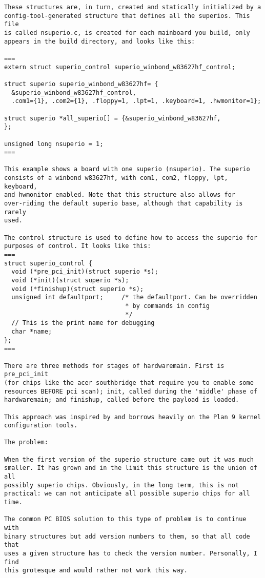 \begin{verbatim}
These structures are, in turn, created and statically initialized by a
config-tool-generated structure that defines all the superios. This file
is called nsuperio.c, is created for each mainboard you build, only 
appears in the build directory, and looks like this:

===
extern struct superio_control superio_winbond_w83627hf_control; 

struct superio superio_winbond_w83627hf= { 
  &superio_winbond_w83627hf_control, 
  .com1={1}, .com2={1}, .floppy=1, .lpt=1, .keyboard=1, .hwmonitor=1};

struct superio *all_superio[] = {&superio_winbond_w83627hf,
};

unsigned long nsuperio = 1;
===

This example shows a board with one superio (nsuperio). The superio
consists of a winbond w83627hf, with com1, com2, floppy, lpt, keyboard, 
and hwmonitor enabled. Note that this structure also allows for 
over-riding the default superio base, although that capability is rarely 
used. 

The control structure is used to define how to access the superio for 
purposes of control. It looks like this:
===
struct superio_control {
  void (*pre_pci_init)(struct superio *s);
  void (*init)(struct superio *s);
  void (*finishup)(struct superio *s);
  unsigned int defaultport;     /* the defaultport. Can be overridden
                                 * by commands in config
                                 */
  // This is the print name for debugging
  char *name;
};
===

There are three methods for stages of hardwaremain. First is pre_pci_init 
(for chips like the acer southbridge that require you to enable some 
resources BEFORE pci scan); init, called during the 'middle' phase of 
hardwaremain; and finishup, called before the payload is loaded. 

This approach was inspired by and borrows heavily on the Plan 9 kernel 
configuration tools. 

The problem:

When the first version of the superio structure came out it was much
smaller. It has grown and in the limit this structure is the union of all
possibly superio chips. Obviously, in the long term, this is not
practical: we can not anticipate all possible superio chips for all time.

The common PC BIOS solution to this type of problem is to continue with 
binary structures but add version numbers to them, so that all code that 
uses a given structure has to check the version number. Personally, I find 
this grotesque and would rather not work this way. 


\end{verbatim}
